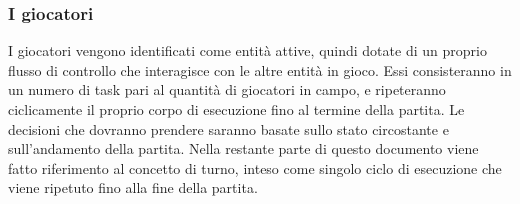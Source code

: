 \subsubsection{I giocatori}
\label{sec:entita_coinvolte_giocatori}

I giocatori vengono identificati come entità attive, quindi dotate di un proprio flusso di controllo che interagisce con le altre entità in gioco. Essi consisteranno in un numero di task pari al quantità di giocatori in campo, e ripeteranno ciclicamente il proprio corpo di esecuzione fino al termine della partita. Le decisioni che dovranno prendere saranno basate sullo stato circostante e sull'andamento della partita. Nella restante parte di questo documento viene fatto riferimento al concetto di turno, inteso come singolo ciclo di esecuzione che viene ripetuto fino alla fine della partita.

%

%

